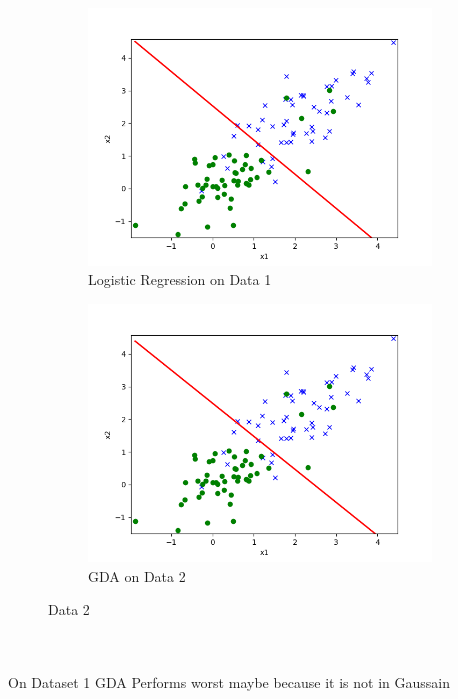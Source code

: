 \begin{answer}
	\\ \\  \\ \\ \\ \\ \\ \\  \\ \\ \\ \\ \\ \\ \\ \\ \\ \\ \\ \\ 
	\begin{figure}[h!]
\centering
\begin{subfigure}{.5\textwidth}
  \centering
  \includegraphics[width=.75\linewidth]{linearclass/logreg_pred_2.png}
  \caption{Logistic Regression  on Data 1}
  \label{fig:sub1}
\end{subfigure}%
\begin{subfigure}{.5\textwidth}
  \centering
  \includegraphics[width=.75\linewidth]{linearclass/gda_pred_2.png}
  \caption{GDA on Data 2}
  \label{fig:sub2}
\end{subfigure}
\caption{Data 2 }
\label{fig:test}
\end{figure}
\\ \\ 
On Dataset 1 GDA Performs worst maybe because it is not in Gaussain
\end{answer}
